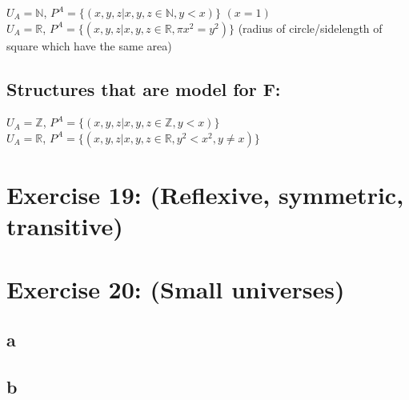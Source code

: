 \documentclass[12pt]{article}
\newcommand{\R}{\mathbb R}
\newcommand{\N}{\mathbb N}
\newcommand{\Z}{\mathbb Z}
\begin{document}
$U_A = \N$, $P^A=\{(x,y,z | x,y,z \in \N, y<x)\}$ $(x=1)$\\
$U_A = \R$, $P^A=\{(x,y,z | x,y,z \in \R, \pi x^2 = y^2)\}$ (radius of circle/sidelength of square which have the same area)

\subsection*{Structures that are model for F:}

$U_A = \Z$, $P^A=\{(x,y,z | x,y,z \in \Z, y<x)\}$\\
$U_A = \R$, $P^A=\{(x,y,z | x,y,z \in \R, y^2<x^2, y \neq x)\}$\\

\section*{Exercise 19: (Reflexive, symmetric, transitive)}

\section*{Exercise 20: (Small universes)}

\subsection*{a}

\subsection*{b}

\end{document}
